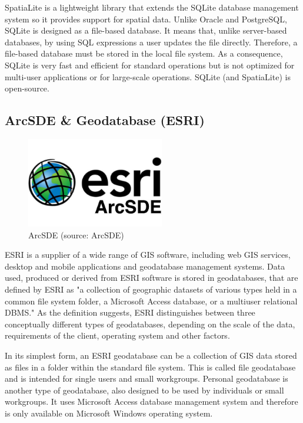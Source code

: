 SpatiaLite is a lightweight library that extends the SQLite database
management system so it provides support for spatial data. Unlike
Oracle and PostgreSQL, SQLite is designed as a file-based database. It
means that, unlike server-based databases, by using SQL expressions a
user updates the file directly. Therefore, a file-based database must
be stored in the local file system. As a consequence, SQLite is very
fast and efficient for standard operations but is not optimized for
multi-user applications or for large-scale operations. SQLite (and
SpatiaLite) is open-source.

\subsection{ArcSDE \& Geodatabase (ESRI)}

\begin{figure}[H] \centering
      \includegraphics[width=170pt]{./pictures/arcsde.png}
      \caption[ArcSDE logo]{ArcSDE (source: ArcSDE)}
      \label{fig:ArcSDE}
  \end{figure}
	
ESRI is a supplier of a wide range of GIS software, including web GIS
services, desktop and mobile applications and geodatabase management
systems. Data used, produced or derived from ESRI software is stored
in geodatabases, that are defined by ESRI as "a collection of
geographic datasets of various types held in a common file system
folder, a Microsoft Access database, or a multiuser relational
DBMS."\cite{esridef} As the definition suggests, ESRI distinguishes
between three conceptually different types of geodatabases, depending
on the scale of the data, requirements of the client, operating system
and other factors.

In its simplest form, an ESRI geodatabase can be a collection of GIS
data stored as files in a folder within the standard file system. This
is called file geodatabase and is intended for single users and small
workgroups. Personal geodatabase is another type of geodatabase, also
designed to be used by individuals or small workgroups. It uses
Microsoft Access database management system and therefore is only
available on Microsoft Windows operating system.

